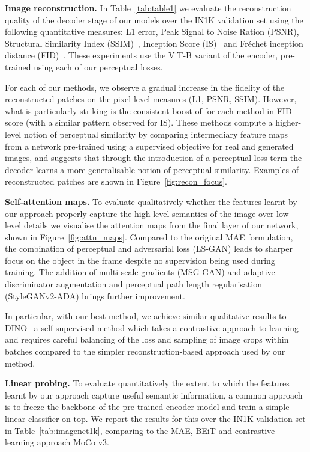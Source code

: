\documentclass[10pt,twocolumn,letterpaper, cta-author]{article}
\begin{document}
\textbf{Image reconstruction.} In Table~\ref{tab:table1} we evaluate the reconstruction quality of the decoder stage of our models over the IN1K validation set using the following quantitative measures: L1 error, Peak Signal to Noise Ration (PSNR), Structural Similarity Index (SSIM)~\cite{1292216}, Inception Score (IS)~\cite{NIPS2016_8a3363ab} and Fréchet inception distance (FID)~\cite{10.5555/3295222.3295408}. These experiments use the ViT-B variant of the encoder, pre-trained using each of our perceptual losses.

For each of our methods, we observe a gradual increase in the fidelity of the reconstructed patches on the pixel-level measures (L1, PSNR, SSIM). However, what is particularly striking is the consistent boost of  for each method in FID score (with a similar pattern observed for IS). These methods compute a higher-level notion of perceptual similarity by comparing intermediary feature maps from a network pre-trained using a supervised objective for real and generated images, and suggests that through the introduction of a perceptual loss term the decoder learns a more generalisable notion of perceptual similarity. Examples of reconstructed patches are shown in Figure~\ref{fig:recon_focus}. 

\textbf{Self-attention maps.} To evaluate qualitatively whether the features learnt by our approach properly capture the high-level semantics of the image over low-level details we visualise the attention maps from the final layer of our network, shown in Figure~\ref{fig:attn_maps}. Compared to the original MAE formulation, the combination of perceptual and adversarial loss (LS-GAN) leads to sharper focus on the object in the frame despite no supervision being used during training. The addition of multi-scale gradients (MSG-GAN) and adaptive discriminator augmentation and perceptual path length regularisation (StyleGANv2-ADA) brings further improvement.

In particular, with our best method, we achieve similar qualitative results to DINO~\cite{caron2021emerging} a self-supervised method which takes a contrastive approach to learning and requires careful balancing of the loss and sampling of image crops within batches compared to the simpler reconstruction-based approach used by our method.

\textbf{Linear probing.} To evaluate quantitatively the extent to which the features learnt by our approach capture useful semantic information, a common approach is to freeze the backbone of the pre-trained encoder model and train a simple linear classifier on top. We report the results for this over the IN1K validation set in Table~\ref{tab:imagenet1k}, comparing to the MAE, BEiT and contrastive learning approach MoCo v3.
\end{document}
